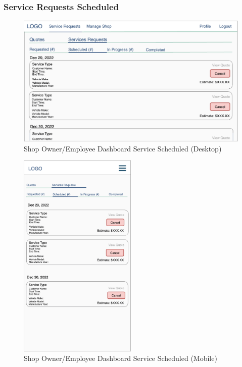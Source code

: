 \documentclass[12pt, titlepage]{article}
\begin{document}
\subsubsection{Service Requests \textemdash{} Scheduled}

\begin{figure}[H]
	\centering
	\includegraphics[width=\textwidth]{mockups/Shop Owner Dashboard (Service Requests - Scheduled) (Desktop).png}
	\caption{Shop Owner/Employee Dashboard \textemdash{} Service \textemdash{} Scheduled (Desktop)}
\end{figure}

\begin{figure}[H]
	\centering
	\includegraphics[width=0.5\textwidth]{mockups/Shop Owner Dashboard (Service Requests - Scheduled) (Mobile).png}
	\caption{Shop Owner/Employee Dashboard \textemdash{} Service \textemdash{} Scheduled (Mobile)}
\end{figure}
\end{document}
